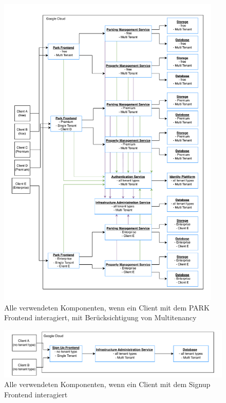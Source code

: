 \begin{figure}[ht]
	\centering
	\includegraphics[width=0.95\textwidth]{resources/03-runtime-view/pdf/components-frontend-park.pdf}
	\caption{Alle verwendeten Komponenten, wenn ein Client mit dem PARK Frontend interagiert, mit Berücksichtigung von Multitenancy}
	\label{fig:components-park-frontend}
\end{figure}

\begin{figure}[ht]
	\centering
	\includegraphics[width=\textwidth]{resources/03-runtime-view/pdf/components-frontend-signup.pdf}
	\caption{Alle verwendeten Komponenten, wenn ein Client mit dem Signup Frontend interagiert}
	\label{fig:components-signup-frontend}
\end{figure}

